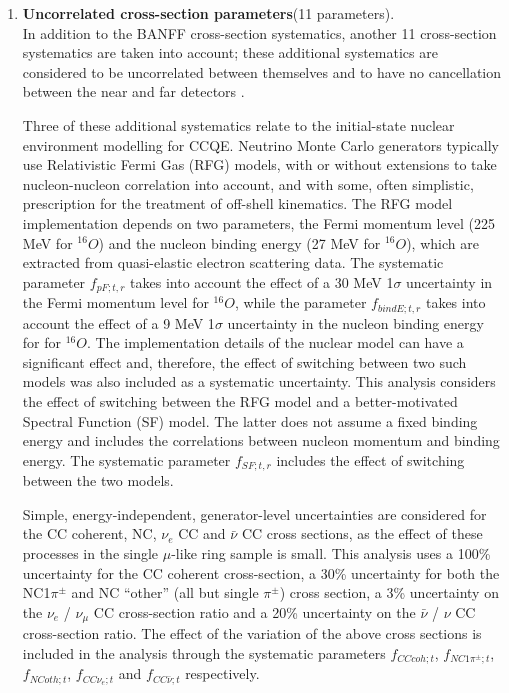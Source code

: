 \begin{enumerate}
\item 
{\bf Uncorrelated cross-section parameters}(11 parameters).\\
In addition to the BANFF cross-section systematics,
another 11 cross-section systematics are taken into account; these additional systematics are considered to be uncorrelated 
between themselves and to have no cancellation between the near and far detectors \cite{NIWGErr} \cite{MoreNIWGErr113} \cite{NIWGNuBarErr}.

Three of these additional systematics relate to the initial-state nuclear environment modelling for CCQE.
Neutrino Monte Carlo generators typically use Relativistic Fermi Gas (RFG) models,
with or without extensions to take nucleon-nucleon correlation into account, 
and with some, often simplistic, prescription for the treatment of off-shell kinematics.
The RFG model implementation depends on two parameters, the Fermi momentum level (225 MeV for $^{16}O$)
and the nucleon binding energy (27 MeV for $^{16}O$), which are extracted from quasi-elastic electron scattering data.
The systematic parameter $f_{pF; t, r}$ takes into account the effect of a 30 MeV 1$\sigma$ uncertainty in the Fermi momentum level
for $^{16}O$, while the parameter $f_{bindE; t, r}$ takes into account the effect of a 9 MeV 1$\sigma$ uncertainty in the nucleon 
binding energy for for $^{16}O$.
The implementation details of the nuclear model can have a significant effect and, therefore,
the effect of switching between two such models was also included as a systematic uncertainty.
This analysis considers the effect of switching between the RFG model and a better-motivated 
Spectral Function (SF) model. The latter does not assume a fixed binding energy and includes the 
correlations between nucleon momentum and binding energy. The systematic parameter $f_{SF; t, r}$ 
includes the effect of switching between the two models.

Simple, energy-independent, generator-level uncertainties are considered for the CC coherent, NC, $\nu_e$ CC
and $\bar{\nu}$ CC cross sections, as the effect of these processes in the single $\mu$-like ring sample is small.
This analysis uses a 100\% uncertainty for the CC coherent cross-section, 
a 30\% uncertainty for both the NC1$\pi^\pm$ and NC ``other'' (all but single $\pi^\pm$) cross section,
a 3\% uncertainty on the $\nu_e$ / $\nu_\mu$ CC cross-section ratio and 
a 20\% uncertainty on the $\bar{\nu}$ / $\nu$ CC cross-section ratio.
The effect of the variation of the above cross sections is included in the analysis
through the systematic parameters $f_{CCcoh; t}$, $f_{NC1\pi^\pm; t}$, $f_{NCoth; t}$,
$f_{CC\nu_e; t}$ and $f_{CC\bar{\nu}; t}$ respectively.


\end{enumerate}

